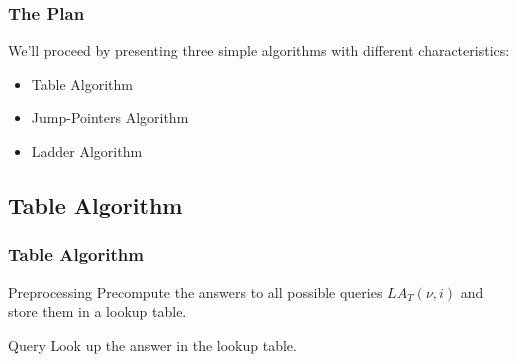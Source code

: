 \documentclass[aspectratio=169]{beamer}
\begin{document}
\begin{frame}
\frametitle{The Plan}

We'll proceed by presenting three simple algorithms with different
characteristics:

\begin{itemize}
\item Table Algorithm 
\item Jump-Pointers Algorithm 
\item Ladder Algorithm 
\end{itemize}


\end{frame}

\subsection{Table Algorithm}

\begin{frame}
\frametitle{Table Algorithm}

\begin{block}{Preprocessing}
  Precompute the answers to all possible queries $LA_T(\nu, i)$ and store
  them in a lookup table.
\end{block}

\pause

\begin{block}{Query}
  Look up the answer in the lookup table.
\end{block}

\end{frame}
\end{document}
